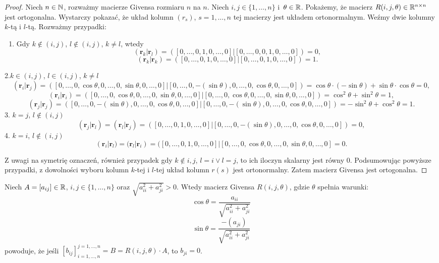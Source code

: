 \documentclass[12pt,a4paper]{report}
\newcommand{\vr}[1]{\mathbf{#1}}
\newcommand{\mx}[1]{{#1}}
\begin{document}
\begin{proof}
Niech $n\in \mathbb{N}$, rozważmy macierze Givensa rozmiaru $n$ na $n$. Niech $i,j \in \{1,\ldots, n\}$ i~$\theta \in \mathbb{R}$. Pokażemy, że macierz $\mx{R}(i,j,\theta) \in \setR^{n\times n}$ jest ortogonalna.
Wystarczy pokazać, że układ kolumn $(r_s)$, $s=1,\ldots, n$ tej macierzy jest układem ortonormalnym. Weźmy dwie kolumny $k$-tą i $l$-tą. Rozważmy przypadki:
\begin{enumerate}
\item Gdy $k\notin (i,j)$, $l\notin (i,j)$, $k \neq l$, wtedy
$$
(\vr{r}_{k}|\vr{r}_{l}) = ([0,\ldots, 0,1,0,\ldots,0]|[0,\ldots,0,0,1,0,\ldots,0]) = 0,
$$
$$
(\vr{r}_{k}|\vr{r}_{k}) = ([0,\ldots, 0,1,0,\ldots,0]|[0,\ldots,0,1,0,\ldots,0]) = 1.
$$
\end{enumerate}

2.$k \in (i,j)$, $l \in (i,j)$, $k \neq l$
{\scriptsize
$$
(\vr{r}_{i}|\vr{r}_{j}) = ([0,\ldots, 0,\cos\theta,0,\ldots,0,\sin\theta,0,\ldots,0]|[0,\ldots, 0,-(\sin\theta),0,\ldots,0,\cos\theta,0,\ldots,0]) = \cos\theta\cdot(-\sin\theta) + \sin\theta\cdot\cos\theta = 0,
$$
$$
(\vr{r}_{i}|\vr{r}_{i}) = ([0,\ldots, 0,\cos\theta,0,\ldots,0,\sin\theta,0,\ldots,0]|[0,\ldots, 0,\cos\theta,0,\ldots,0,\sin\theta,0,\ldots,0]) = \cos^{2}\theta + \sin^{2}\theta = 1,
$$
$$
(\vr{r}_{j}|\vr{r}_{j}) = ([0,\ldots, 0,-(\sin\theta),0,\ldots,0,\cos\theta,0,\ldots,0]|[0,\ldots, 0,-(\sin\theta),0,\ldots,0,\cos\theta,0,\ldots,0]) = -\sin^{2}\theta + \cos^{2}\theta = 1.
$$
}
3. $k=j$, $l\notin (i,j)$
$$
(\vr{r}_{j}|\vr{r}_{l}) = (\vr{r}_{l}|\vr{r}_{j})= ([0,\ldots, 0,1,0,\ldots,0]|[0,\ldots, 0,-(\sin\theta),0,\ldots,0,\cos\theta,0,\ldots,0]) = 0,
$$
4. $k=i$, $l\notin(i,j)$
$$
(\vr{r}_{i}|\vr{r}_{l}) = (\vr{r}_{l}|\vr{r}_{i})= ([0,\ldots, 0,1,0,\ldots,0]|[0,\ldots, 0,\cos\theta,0,\ldots,0,\sin\theta,0,\ldots,0] = 0.
$$

Z uwagi na symetrię oznaczeń, również przypadek gdy $k\notin{i,j}$, $l=i \lor l=j$, to ich iloczyn skalarny jest równy $0$. Podsumowując powyższe przypadki, z dowolności wyboru kolumn $k$-tej i $l$-tej układ kolumn $r(s)$ jest ortonormalny. Zatem macierz Givensa jest ortogonalna.
\end{proof}

\begin{lemma}
Niech $\mx{A} = [a_{ij}] \in \setR$, $i,j \in \{1, \ldots, n\}$ oraz $\sqrt{a_{ii}^{2} + a_{ji}^{2}} > 0$. Wtedy macierz Givensa $\mx{R}(i,j, \theta)$, gdzie $\theta$ spełnia warunki:
$$
\cos\theta = \frac{a_{ii}}{\sqrt{a_{ii}^{2} + a_{ji}^{2}}}
$$
$$
\sin\theta = \frac{-(a_{ji})}{\sqrt{a_{ii}^{2} + a_{ji}^{2}}}
$$
powoduje, że jeśli $[b_{ij}]_{i=1,\ldots,n}^{j=1,\ldots,n} = \mx{B} = \mx{R}(i,j,\theta)\cdot \mx{A}$, to 
$b_{ji}=0$.
\end{lemma}
\end{document}
